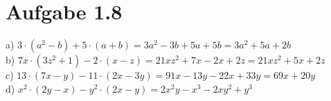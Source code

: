 \documentclass[a4paper, 10pt]{scrartcl}
\begin{document}
\section{Aufgabe 1.8}

a) $3\cdot(a^{2} - b) + 5\cdot(a + b) = 3a^{2} - 3b + 5a + 5b = 3a^{2} + 5a + 2b$\\
b) $7x\cdot(3z^{2} + 1) - 2\cdot(x - z) = 21xz^{2} + 7x - 2x + 2z = 21xz^{2} + 5x + 2z$\\
c) $13\cdot(7x - y) - 11\cdot(2x - 3y) = 91x - 13y - 22x + 33y = 69x + 20y$\\
d) $x^{2}\cdot(2y - x) - y^{2}\cdot(2x - y) = 2x^{2}y - x^{3} - 2xy^{2} + y^{3}$\\
\end{document}
